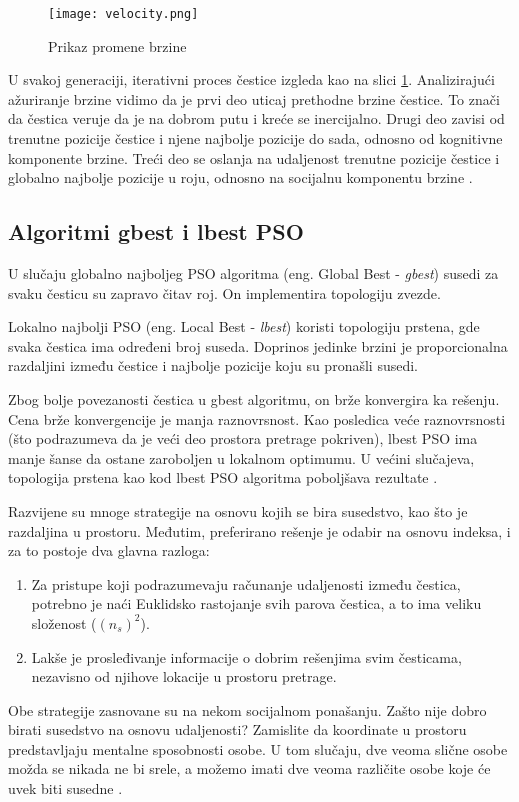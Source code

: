 \documentclass[a4paper]{article}
\begin{document}
\begin{figure}[htp]
    \centering
    \texttt{[image: velocity.png]}
    \caption{Prikaz promene brzine}
    \label{fig:velocity}
\end{figure}

U svakoj generaciji, iterativni proces čestice izgleda kao na slici \ref{fig:velocity}. Analizirajući ažuriranje brzine vidimo da je prvi deo uticaj prethodne brzine čestice. To znači da čestica veruje da je na dobrom putu i kreće se inercijalno. Drugi deo zavisi od trenutne pozicije čestice i njene najbolje pozicije do sada, odnosno od kognitivne komponente brzine. Treći deo se oslanja na udaljenost trenutne pozicije čestice i globalno najbolje pozicije u roju, odnosno na socijalnu komponentu brzine \cite{wang2018particle}. 

\subsection{Algoritmi gbest i lbest PSO}
\label{subsec:podnaslov1}

U slučaju globalno najboljeg PSO algoritma (eng. Global Best - \textit{gbest}) susedi za svaku česticu su zapravo čitav roj. On implementira topologiju zvezde. 

Lokalno najbolji PSO (eng. Local Best - \textit{lbest}) koristi topologiju prstena, gde svaka čestica ima određeni broj suseda. Doprinos jedinke brzini je proporcionalna razdaljini između čestice i najbolje pozicije koju su pronašli susedi. 

Zbog bolje povezanosti čestica u gbest algoritmu, on brže konvergira ka rešenju. Cena brže konvergencije je manja raznovrsnost. Kao posledica veće raznovrsnosti (što podrazumeva da je veći deo prostora pretrage pokriven), lbest PSO ima manje šanse da ostane zaroboljen u lokalnom optimumu. U većini slučajeva, topologija prstena kao kod lbest PSO algoritma poboljšava rezultate \cite{engelbrecht2007computational}.

Razvijene su mnoge strategije na osnovu kojih se bira susedstvo, kao što je razdaljina u prostoru. Međutim, preferirano rešenje je odabir na osnovu indeksa, i za to postoje dva glavna razloga:
\begin{enumerate}
    \item Za pristupe koji podrazumevaju računanje udaljenosti između čestica, potrebno je naći Euklidsko rastojanje svih parova čestica, a to ima veliku složenost ($(n_s)^2$).
    \item Lakše je prosleđivanje informacije o dobrim rešenjima svim česticama, nezavisno od njihove lokacije u prostoru pretrage.

\end{enumerate}
Obe strategije zasnovane su na nekom socijalnom ponašanju. Zašto nije dobro birati susedstvo na osnovu udaljenosti? Zamislite da koordinate u prostoru predstavljaju mentalne sposobnosti osobe. U tom slučaju, dve veoma slične osobe možda se nikada ne bi srele, a možemo imati dve veoma različite osobe koje će uvek biti susedne \cite{liu2006particle}.
    
\end{document}
